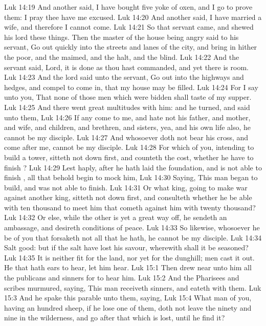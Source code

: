 \vs Luk 14:19 And another said, I have bought five yoke of oxen, and I go to prove them: I pray thee have me excused.
\vs Luk 14:20 And another said, I have married a wife, and therefore I cannot come.
\vs Luk 14:21 So that servant came, and shewed his lord these things. Then the master of the house being angry said to his servant, Go out quickly into the streets and lanes of the city, and bring in hither the poor, and the maimed, and the halt, and the blind.
\vs Luk 14:22 And the servant said, Lord, it is done as thou hast commanded, and yet there is room.
\vs Luk 14:23 And the lord said unto the servant, Go out into the highways and hedges, and compel  to come in, that my house may be filled.
\vs Luk 14:24 For I say unto you, That none of those men which were bidden shall taste of my supper.
\vs Luk 14:25 And there went great multitudes with him: and he turned, and said unto them,
\vs Luk 14:26 If any  come to me, and hate not his father, and mother, and wife, and children, and brethren, and sisters, yea, and his own life also, he cannot be my disciple.
\vs Luk 14:27 And whosoever doth not bear his cross, and come after me, cannot be my disciple.
\vs Luk 14:28 For which of you, intending to build a tower, sitteth not down first, and counteth the cost, whether he have  to finish ?
\vs Luk 14:29 Lest haply, after he hath laid the foundation, and is not able to finish , all that behold  begin to mock him,
\vs Luk 14:30 Saying, This man began to build, and was not able to finish.
\vs Luk 14:31 Or what king, going to make war against another king, sitteth not down first, and consulteth whether he be able with ten thousand to meet him that cometh against him with twenty thousand?
\vs Luk 14:32 Or else, while the other is yet a great way off, he sendeth an ambassage, and desireth conditions of peace.
\vs Luk 14:33 So likewise, whosoever he be of you that forsaketh not all that he hath, he cannot be my disciple.
\vs Luk 14:34 Salt  good: but if the salt have lost his savour, wherewith shall it be seasoned?
\vs Luk 14:35 It is neither fit for the land, nor yet for the dunghill;  men cast it out. He that hath ears to hear, let him hear.
\vs Luk 15:1 Then drew near unto him all the publicans and sinners for to hear him.
\vs Luk 15:2 And the Pharisees and scribes murmured, saying, This man receiveth sinners, and eateth with them.
\vs Luk 15:3 And he spake this parable unto them, saying,
\vs Luk 15:4 What man of you, having an hundred sheep, if he lose one of them, doth not leave the ninety and nine in the wilderness, and go after that which is lost, until he find it?

